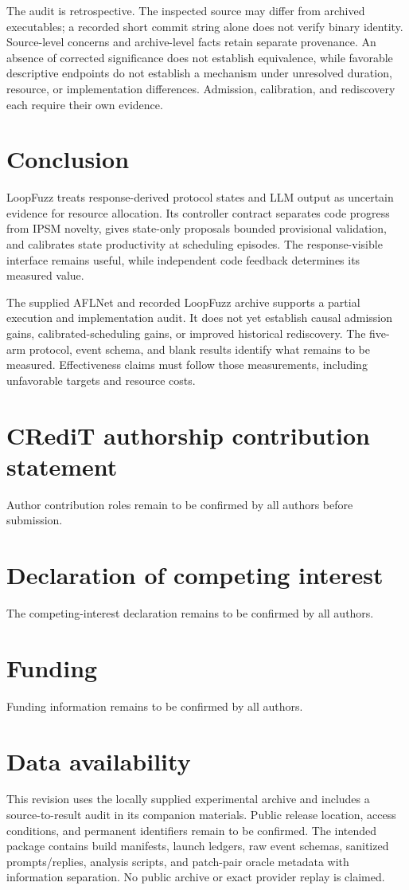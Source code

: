 \documentclass[final,5p,times,number]{elsarticle}
\begin{document}
The audit is retrospective. The inspected source may differ from archived executables; a recorded short commit string alone does not verify binary identity. Source-level concerns and archive-level facts retain separate provenance. An absence of corrected significance does not establish equivalence, while favorable descriptive endpoints do not establish a mechanism under unresolved duration, resource, or implementation differences. Admission, calibration, and rediscovery each require their own evidence.

\section{Conclusion}
LoopFuzz treats response-derived protocol states and LLM output as uncertain evidence for resource allocation. Its controller contract separates code progress from IPSM novelty, gives state-only proposals bounded provisional validation, and calibrates state productivity at scheduling episodes. The response-visible interface remains useful, while independent code feedback determines its measured value.

The supplied AFLNet and recorded LoopFuzz archive supports a partial execution and implementation audit. It does not yet establish causal admission gains, calibrated-scheduling gains, or improved historical rediscovery. The five-arm protocol, event schema, and blank results identify what remains to be measured. Effectiveness claims must follow those measurements, including unfavorable targets and resource costs.

\section*{CRediT authorship contribution statement}
Author contribution roles remain to be confirmed by all authors before submission.
\section*{Declaration of competing interest}
The competing-interest declaration remains to be confirmed by all authors.
\section*{Funding}
Funding information remains to be confirmed by all authors.
\section*{Data availability}
This revision uses the locally supplied experimental archive and includes a source-to-result audit in its companion materials. Public release location, access conditions, and permanent identifiers remain to be confirmed. The intended package contains build manifests, launch ledgers, raw event schemas, sanitized prompts/replies, analysis scripts, and patch-pair oracle metadata with information separation. No public archive or exact provider replay is claimed.
\end{document}
